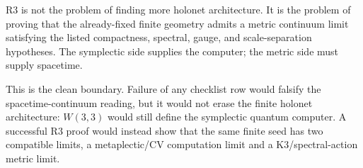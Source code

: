 \begin{principle}
\label{pr:bt1202-r3-convergence-residual}
R3 is not the problem of finding more holonet architecture.  It is the problem
of proving that the already-fixed finite geometry admits a metric continuum
limit satisfying the listed compactness, spectral, gauge, and scale-separation
hypotheses.  The symplectic side supplies the computer; the metric side must
supply spacetime.
\end{principle}

This is the clean boundary.  Failure of any checklist row would falsify the
spacetime-continuum reading, but it would not erase the finite holonet
architecture: $W(3,3)$ would still define the symplectic quantum computer.  A
successful R3 proof would instead show that the same finite seed has two
compatible limits, a metaplectic/CV computation limit and a K3/spectral-action
metric limit.
